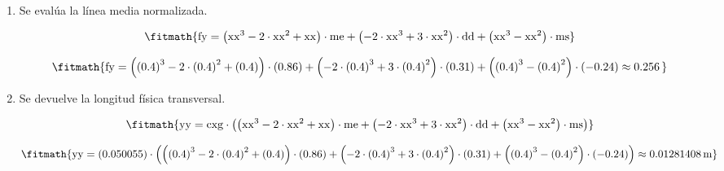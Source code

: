 \begin{enumerate}

\item Se evalúa la línea media normalizada.

\[\fitmath{\mathrm{fy}=\left({\mathrm{xx}}^{3}-2\cdot {\mathrm{xx}}^{2}+\mathrm{xx}\right)\cdot \mathrm{me}+\left(-2\cdot {\mathrm{xx}}^{3}+3\cdot {\mathrm{xx}}^{2}\right)\cdot \mathrm{dd}+\left({\mathrm{xx}}^{3}-{\mathrm{xx}}^{2}\right)\cdot \mathrm{ms}}\]

\[\fitmath{\mathrm{fy}=\left({(0.4)}^{3}-2\cdot {(0.4)}^{2}+(0.4)\right)\cdot (0.86)+\left(-2\cdot {(0.4)}^{3}+3\cdot {(0.4)}^{2}\right)\cdot (0.31)+\left({(0.4)}^{3}-{(0.4)}^{2}\right)\cdot (-0.24)\approx 0.256\,}\]

\item Se devuelve la longitud física transversal.

\[\fitmath{\mathrm{yy}=\mathrm{cxg}\cdot \left(\left({\mathrm{xx}}^{3}-2\cdot {\mathrm{xx}}^{2}+\mathrm{xx}\right)\cdot \mathrm{me}+\left(-2\cdot {\mathrm{xx}}^{3}+3\cdot {\mathrm{xx}}^{2}\right)\cdot \mathrm{dd}+\left({\mathrm{xx}}^{3}-{\mathrm{xx}}^{2}\right)\cdot \mathrm{ms}\right)}\]

\[\fitmath{\mathrm{yy}=(0.050055)\cdot \left(\left({(0.4)}^{3}-2\cdot {(0.4)}^{2}+(0.4)\right)\cdot (0.86)+\left(-2\cdot {(0.4)}^{3}+3\cdot {(0.4)}^{2}\right)\cdot (0.31)+\left({(0.4)}^{3}-{(0.4)}^{2}\right)\cdot (-0.24)\right)\approx 0.01281408\,\mathrm{m}}\]

\end{enumerate}
